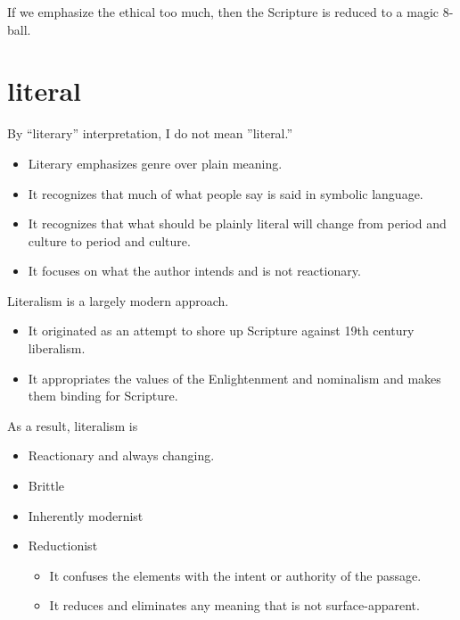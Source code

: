 \documentclass{beamer}
\begin{document}
\begin{frame}
  If we emphasize the ethical too much, then the Scripture is reduced to a magic 8-ball.
\end{frame}

\section{literal}

\begin{frame}
  By ``literary'' interpretation, I do not mean ''literal.''\pause
  \begin{itemize}
	\item Literary emphasizes genre over plain meaning.\pause
	\item It recognizes that much of what people say is said in symbolic language.\pause
	\item It recognizes that what should be plainly literal will change from period and culture to period and culture.\pause
	\item It focuses on what the author intends and is not reactionary.
  \end{itemize}
\end{frame}

\begin{frame}
  Literalism is a largely modern approach.\pause
  \begin{itemize}
	\item It originated as an attempt to shore up Scripture against 19th century liberalism.\pause
	\item It appropriates the values of the Enlightenment and nominalism and makes them binding for Scripture.
  \end{itemize}
\end{frame}

\begin{frame}
  As a result, literalism is\pause
  \begin{itemize}
	\item Reactionary and always changing.\pause
	\item Brittle\pause
	\item Inherently modernist\pause
	\item Reductionist\pause
	  \begin{itemize}
		\item It confuses the elements with the intent or authority of the passage.\pause
		\item It reduces and eliminates any meaning that is not surface-apparent.
	  \end{itemize}
  \end{itemize}
\end{frame}
\end{document}
